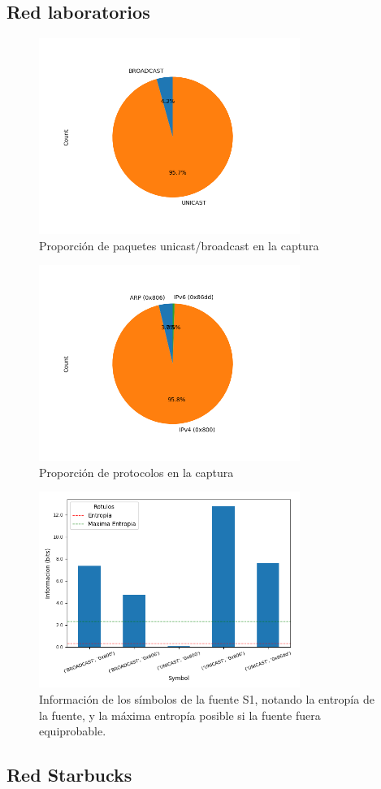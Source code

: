 \subsection*{Red laboratorios}
\begin{figure}[H]
  \centering
  \includegraphics[width=8.5cm]{figs/broadcast_proportion_labo6_2018_04_18_S1_output.png}
  \caption{\normalfont Proporción de paquetes unicast/broadcast en la captura}
\end{figure}

\begin{figure}[H]
  \centering
  \includegraphics[width=8.5cm]{figs/protocols_proportion_labo6_2018_04_18_S1_output.png}
  \caption{\normalfont Proporción de protocolos en la captura}
\end{figure}

\begin{figure}[H]
  \centering
  \includegraphics[width=8.5cm]{figs/information_labo6_2018_04_18_S1_output.png}
  \caption{\normalfont Información de los símbolos de la fuente S1, notando la entropía de la fuente, y la máxima entropía posible si la fuente fuera equiprobable.}
\end{figure}

\subsection*{Red Starbucks}
